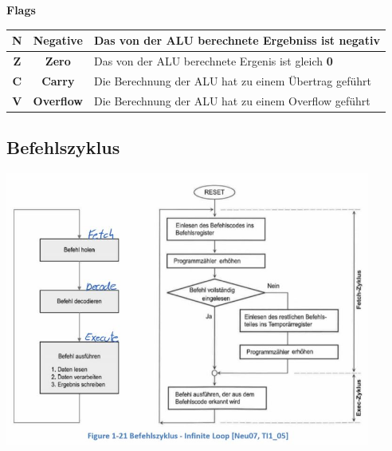 \begin{multicols}{2}
    \begin{minipage}{8cm}
        \textbf{Flags}\newline
        \begin{tabular}{|c|c|l|}
            \hline 
            \textbf{N}  &\textbf{Negative}  & Das von der ALU berechnete Ergebniss ist negativ \\ 
            \hline 
            \textbf{Z}  &\textbf{Zero}      & Das von der ALU berechnete Ergenis ist gleich \textbf{0} \\ 
            \hline 
            \textbf{C}  &\textbf{Carry}     & Die Berechnung der ALU hat zu einem Übertrag geführt  \\ 
            \hline 
            \textbf{V}  &\textbf{Overflow}  & Die Berechnung der ALU hat zu einem Overflow geführt  \\ 
            \hline 
        \end{tabular} 
    \end{minipage}
\end{multicols}

\subsection{Befehlszyklus}
    \includegraphics[height=9cm]{images/CommandFlowChart}
